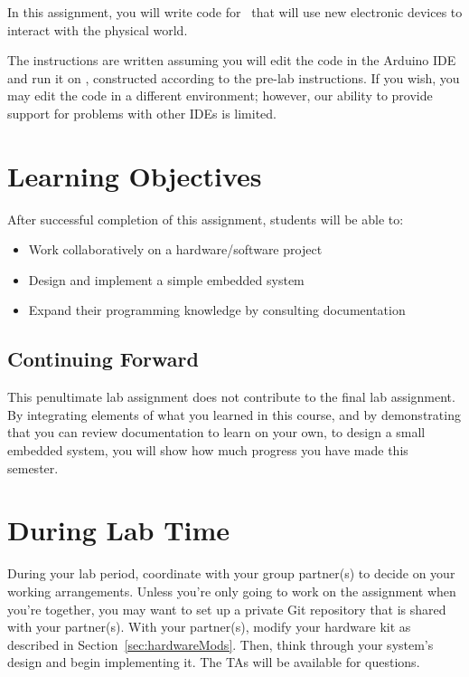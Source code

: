 In this assignment, you will write code for \runtimeenvironment\ that will use new electronic devices to interact with the physical world.

The instructions are written assuming you will edit the code in the Arduino IDE and run it on \runtimeenvironment, constructed according to the pre-lab instructions.
If you wish, you may edit the code in a different environment; however, our ability to provide support for problems with other IDEs is limited.

\section*{Learning Objectives}

After successful completion of this assignment, students will be able to:
\begin{itemize}
    \item Work collaboratively on a hardware/software project
    \item Design and implement a simple embedded system
    \item Expand their programming knowledge by consulting documentation
\end{itemize}

\subsection*{Continuing Forward}

This penultimate lab assignment does not contribute to the final lab assignment.
By integrating elements of what you learned in this course, and by demonstrating that you can review documentation to learn on your own, to design a small embedded system, you will show how much progress you have made this semester.

\section*{During Lab Time}

During your lab period, coordinate with your group partner(s) to decide on your working arrangements.
Unless you're only going to work on the assignment when you're together, you may want to set up a private Git repository that is shared with your partner(s).
With your partner(s), modify your hardware kit as described in Section~\ref{sec:hardwareMods}.
Then, think through your system's design and begin implementing it.
The TAs will be available for questions.
